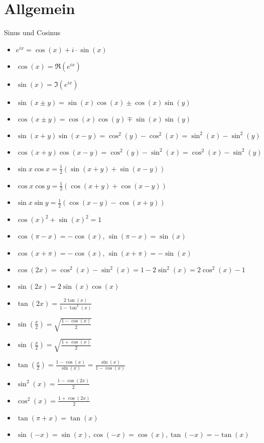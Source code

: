 \section{Allgemein}



\begin{Rechenregeln}{Sinus und Cosinus}{}
    \begin{itemize}
    \item $e^{ix} = \cos(x) + i\cdot \sin(x)$
    \item $\cos(x) = \Re(e^{ix})$
    \item $\sin(x) = \Im(e^{ix})$
    \item $\sin(x\pm y) = \sin(x)\cos(x) \pm \cos(x)\sin(y)$ 
    \item $\cos(x\pm y) = \cos(x)\cos(y) \mp \sin(x)\sin(y)$
    \item $\sin(x+y)\sin(x-y) = \cos^2(y) - \cos^2(x) = \sin^2(x) - \sin^2(y)$
    \item $\cos(x+y)\cos(x-y) = \cos^2(y) - \sin^2(x) = \cos^2(x) - \sin^2(y)$
    \item $\sin{x}\cos{x} = \frac{1}{2}(\sin(x+y) + \sin(x-y))$ 
    \item $\cos{x}\cos{y} = \frac{1}{2}(\cos(x+y) + \cos(x-y))$
    \item  $\sin{x}\sin{y} = \frac{1}{2}(\cos(x-y)-\cos(x+y))$
    \item $\cos(x)^2 + \sin(x)^2 = 1$
    \item $\cos(\pi-x) = -\cos(x)$, $\sin(\pi-x) = \sin(x)$
    \item $\cos(x+\pi) = -\cos(x)$, $\sin(x+\pi) = -\sin(x)$
    \item $\cos(2x) = \cos^2(x) - \sin^2(x) = 1-2\sin^2(x) = 2\cos^2(x) - 1$
    \item $\sin(2x) = 2\sin(x)\cos(x)$
    \item $\tan(2x) = \frac{2\tan(x)}{1-\tan^2(x)}$
    \item $\sin(\frac{x}{2}) = \sqrt{\frac{1-\cos(x)}{2}}$
    \item $\sin(\frac{x}{2}) = \sqrt{\frac{1+\cos(x)}{2}}$
    \item $\tan(\frac{x}{2}) = \frac{1-\cos(x)}{\sin(x)} = \frac{\sin(x)}{1-\cos(x)}$
    \item $\sin^2(x) = \frac{1-\cos(2x)}{2}$
    \item $\cos^2(x) = \frac{1+\cos(2x)}{2}$
    \item $\tan(\pi + x) = \tan(x)$
    \item $\sin(-x) = \sin(x), \cos(-x) = \cos(x), \tan(-x) = -\tan(x)$

\end{itemize}
\end{Rechenregeln}
